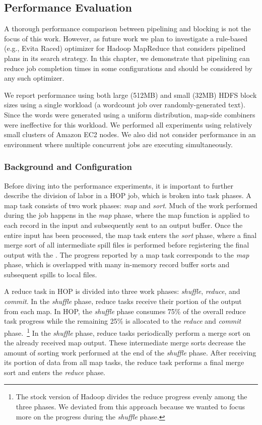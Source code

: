 \subsection{Performance Evaluation}
\label{ch:hop:sec:perf}

A thorough performance comparison between pipelining and blocking is not the
focus of this work.  However, as future work we plan to investigate a
rule-based (e.g., Evita Raced) optimizer for Hadoop MapReduce that considers
pipelined plans in its search strategy.  In this chapter, we demonstrate that
pipelining can reduce job completion times in some configurations and should be
considered by any such optimizer.

We report performance using both large (512MB) and small (32MB) HDFS block
sizes using a single workload (a wordcount job over randomly-generated text).
Since the words were generated using a uniform distribution, map-side combiners
were ineffective for this workload.  We performed all experiments using
relatively small clusters of Amazon EC2 nodes.  We also did not consider
performance in an environment where multiple concurrent jobs are executing
simultaneously.

\subsubsection{Background and Configuration}

Before diving into the performance experiments, it is important to further
describe the division of labor in a HOP job, which is broken into task phases.
A map task consists of two work phases: {\em map} and {\em sort}.  Much of the
work performed during the job happens in the {\em map} phase, where the map
function is applied to each record in the input and subsequently sent to an
output buffer.  Once the entire input has been processed, the map task enters
the {\em sort} phase, where a final merge sort of all intermediate spill files
is performed before registering the final output with the \TT.  The progress
reported by a map task corresponds to the {\em map} phase, which is overlapped
with many in-memory record buffer sorts and subsequent spills to local files.

A reduce task in HOP is divided into three work phases: {\em shuffle}, {\em
reduce}, and {\em commit}.  In the {\em shuffle} phase, reduce tasks receive
their portion of the output from each map.  In HOP, the {\em shuffle} phase
consumes 75\% of the overall reduce task progress while the remaining 25\% is
allocated to the {\em reduce} and {\em commit} phase.~\footnote{The stock
version of Hadoop divides the reduce progress evenly among the three phases.
We deviated from this approach because we wanted to focus more on the progress
during the {\em shuffle} phase.} In the {\em shuffle} phase, reduce tasks
periodically perform a merge sort on the already received map output.  These
intermediate merge sorts decrease the amount of sorting work performed at the
end of the {\em shuffle} phase.  After receiving its portion of data from all
map tasks, the reduce task performs a final merge sort and enters the {\em
reduce} phase.

